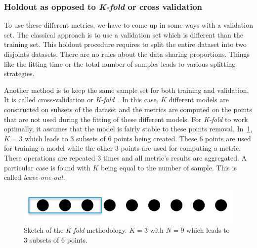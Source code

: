 \subsubsection{Holdout as opposed to \emph{K-fold} or cross validation}
To use these different metrics, we have to come up in some ways with a validation set. The classical approach is to use a validation set which is different than the training set. This holdout procedure requires to split the entire dataset into two disjoints datasets. There are no rules about the data sharing proportions. Things like the fitting time or the total number of samples leads to various splitting strategies.

Another method is to keep the same sample set for both training and validation. It is called cross-validation or \emph{K-fold}~\cite{kohavi1995}. In this case, $K$ different models are constructed on subsets of the dataset and the metrics are computed on the points that are not used during the fitting of these different models. For \emph{K-fold} to work optimally, it assumes that the model is fairly stable to these points removal. In~\cref{fig:k_fold}, $K=3$ which leads to 3 subsets of 6 points being created. These 6 points are used for training a model while the other 3 points are used for computing a metric. These operations are repeated 3 times and all metric's results are aggregated. A particular case is found with $K$ being equal to the number of sample. This is called \emph{leave-one-out}.

\begin{figure}[!h]
\centering
\includegraphics[width=0.6\linewidth,keepaspectratio]{fig/literature/k_fold.png}
\caption{Sketch of the \emph{K-fold} methodology. $K=3$ with $N=9$ which leads to 3 subsets of 6 points.}
\label{fig:k_fold}
\end{figure}


